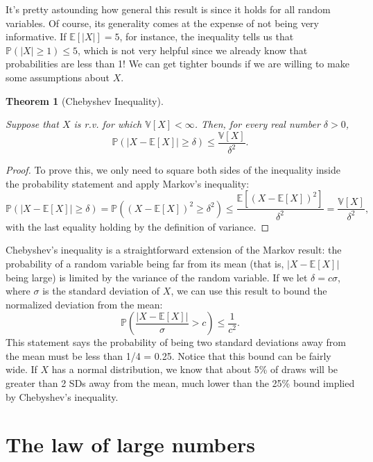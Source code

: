 \documentclass[
  letterpaper,
  DIV=11,
  numbers=noendperiod]{scrreprt}
\newcommand{\E}{\mathbb{E}}
\newcommand{\V}{\mathbb{V}}
\renewcommand{\P}{\mathbb{P}}
\theoremstyle{plain}
\newtheorem{theorem}{Theorem}[chapter]
\theoremstyle{definition}
\theoremstyle{definition}
\theoremstyle{remark}
\begin{document}
It's pretty astounding how general this result is since it holds for all
random variables. Of course, its generality comes at the expense of not
being very informative. If \(\E[|X|] = 5\), for instance, the inequality
tells us that \(\P(|X| \geq 1) \leq 5\), which is not very helpful since
we already know that probabilities are less than 1! We can get tighter
bounds if we are willing to make some assumptions about \(X\).

\begin{theorem}[Chebyshev
Inequality]\protect\hypertarget{thm-chebyshev}{}\label{thm-chebyshev}

Suppose that \(X\) is r.v. for which \(\V[X] < \infty\). Then, for every
real number \(\delta > 0\), \[
\P(|X-\E[X]| \geq \delta) \leq \frac{\V[X]}{\delta^2}.
\]

\end{theorem}

\begin{proof}

To prove this, we only need to square both sides of the inequality
inside the probability statement and apply Markov's inequality: \[
\P\left( |X - \E[X]| \geq \delta \right) = \P((X-\E[X])^2 \geq \delta^2) \leq \frac{\E[(X - \E[X])^2]}{\delta^2} = \frac{\V[X]}{\delta^2},
\] with the last equality holding by the definition of variance.

\end{proof}

Chebyshev's inequality is a straightforward extension of the Markov
result: the probability of a random variable being far from its mean
(that is, \(|X-\E[X]|\) being large) is limited by the variance of the
random variable. If we let \(\delta = c\sigma\), where \(\sigma\) is the
standard deviation of \(X\), we can use this result to bound the
normalized deviation from the mean: \[
\P\left(\frac{|X - \E[X]|}{\sigma} > c \right) \leq \frac{1}{c^2}.
\] This statement says the probability of being two standard deviations
away from the mean must be less than 1/4 = 0.25. Notice that this bound
can be fairly wide. If \(X\) has a normal distribution, we know that
about 5\% of draws will be greater than 2 SDs away from the mean, much
lower than the 25\% bound implied by Chebyshev's inequality.

\hypertarget{the-law-of-large-numbers}{%
\section{The law of large numbers}\label{the-law-of-large-numbers}}
\end{document}
